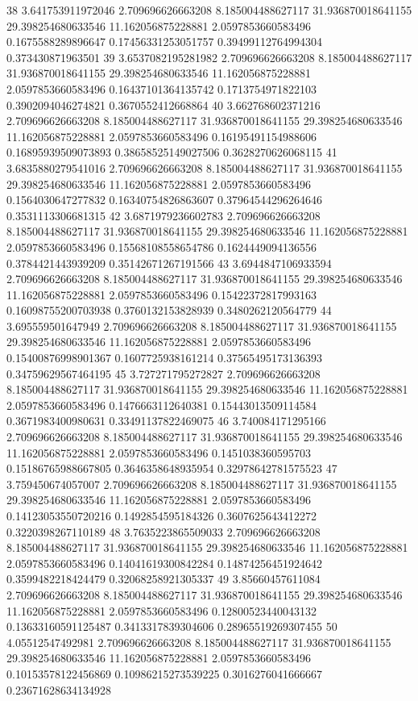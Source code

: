 {38 3.641753911972046 2.709696626663208 8.185004488627117 31.936870018641155 29.398254680633546 11.162056875228881 2.0597853660583496 0.1675588289896647 0.17456331253051757 0.39499112764994304 0.373430871963501
39 3.6537082195281982 2.709696626663208 8.185004488627117 31.936870018641155 29.398254680633546 11.162056875228881 2.0597853660583496 0.16437101364135742 0.1713754971822103 0.3902094046274821 0.3670552412668864
40 3.662768602371216 2.709696626663208 8.185004488627117 31.936870018641155 29.398254680633546 11.162056875228881 2.0597853660583496 0.16195491154988606 0.16895939509073893 0.38658525149027506 0.3628270626068115
41 3.6835880279541016 2.709696626663208 8.185004488627117 31.936870018641155 29.398254680633546 11.162056875228881 2.0597853660583496 0.1564030647277832 0.16340754826863607 0.37964544296264646 0.3531113306681315
42 3.6871979236602783 2.709696626663208 8.185004488627117 31.936870018641155 29.398254680633546 11.162056875228881 2.0597853660583496 0.15568108558654786 0.1624449094136556 0.3784421443939209 0.35142671267191566
43 3.6944847106933594 2.709696626663208 8.185004488627117 31.936870018641155 29.398254680633546 11.162056875228881 2.0597853660583496 0.15422372817993163 0.16098755200703938 0.3760132153828939 0.3480262120564779
44 3.695559501647949 2.709696626663208 8.185004488627117 31.936870018641155 29.398254680633546 11.162056875228881 2.0597853660583496 0.15400876998901367 0.1607725938161214 0.37565495173136393 0.34759629567464195
45 3.727271795272827 2.709696626663208 8.185004488627117 31.936870018641155 29.398254680633546 11.162056875228881 2.0597853660583496 0.1476663112640381 0.15443013509114584 0.3671983400980631 0.33491137822469075
46 3.740084171295166 2.709696626663208 8.185004488627117 31.936870018641155 29.398254680633546 11.162056875228881 2.0597853660583496 0.1451038360595703 0.15186765988667805 0.3646358648935954 0.32978642781575523
47 3.759450674057007 2.709696626663208 8.185004488627117 31.936870018641155 29.398254680633546 11.162056875228881 2.0597853660583496 0.14123053550720216 0.1492854595184326 0.3607625643412272 0.3220398267110189
48 3.7635223865509033 2.709696626663208 8.185004488627117 31.936870018641155 29.398254680633546 11.162056875228881 2.0597853660583496 0.14041619300842284 0.14874256451924642 0.3599482218424479 0.32068258921305337
49 3.85660457611084 2.709696626663208 8.185004488627117 31.936870018641155 29.398254680633546 11.162056875228881 2.0597853660583496 0.12800523440043132 0.13633160591125487 0.3413317839304606 0.28965519269307455
50 4.05512547492981 2.709696626663208 8.185004488627117 31.936870018641155 29.398254680633546 11.162056875228881 2.0597853660583496 0.10153578122456869 0.10986215273539225 0.3016276041666667 0.23671628634134928
}
